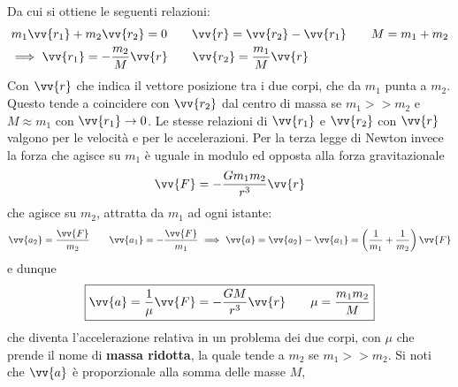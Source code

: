 \documentclass[a4paper, oneside]{book}
\begin{document}
\begin{center}
\end{center}
Da cui si ottiene le seguenti relazioni:
\begin{align*}
    &m_1 \vv{r_1} + m_2\vv{r_2} = 0 \qquad \vv{r} = \vv{r_2} - \vv{r_1} \qquad M = m_1 + m_2 \\
    &\Longrightarrow \  \vv{r_1} = - \frac{m_2}{M}\vv{r} \qquad \vv{r_2} = \frac{m_1}{M}\vv{r}        
\end{align*}
Con $\vv{r}$ che indica il vettore posizione tra i due corpi, che da $m_1$ punta a $m_2$. Questo tende 
a coincidere con  $\vv{r_2}$ dal centro di massa se $m_1 >> m_2$ e
$M \approx m_1$ con $\vv{r_1} \to 0$. Le stesse relazioni di $\vv{r_1}$ 
e $\vv{r_2}$ con $\vv{r}$ valgono per le velocità e per le accelerazioni. Per la 
terza legge di Newton invece la forza che agisce su $m_1$ è uguale in modulo ed opposta 
alla forza gravitazionale
\begin{gather*}
    \vv{F} = - \frac{Gm_1m_2}{r^{3}} \vv{r}  
\end{gather*}     
che agisce su $m_2$, attratta da $m_1$ ad ogni istante: 
\begin{gather*}
    \vv{a_2} = \frac{\vv{F} }{m_2} \qquad \vv{a_1} = - \frac{\vv{F} }{m_1} \ \Longrightarrow \ \vv{a} = \vv{a_2} - \vv{a_1} = \left(\frac{1}{m_1} + \frac{1}{m_2}\right)      \vv{F} 
\end{gather*}
e dunque
\begin{align}
    \boxed{\vv{a} = \frac{1}{\mu} \vv{F} = - \frac{GM}{r^{3}}\vv{r}    \qquad \mu = \frac{m_1m_2}{M}}
\end{align}
che diventa l'accelerazione relativa in un problema dei due corpi, con 
$\mu$ che prende il nome di \textbf{massa ridotta}, la quale tende a $m_2$ se $m_1 >> m_2$. 
Si noti che $\vv{a}$ è proporzionale alla somma delle masse $M$, 
\end{document}
